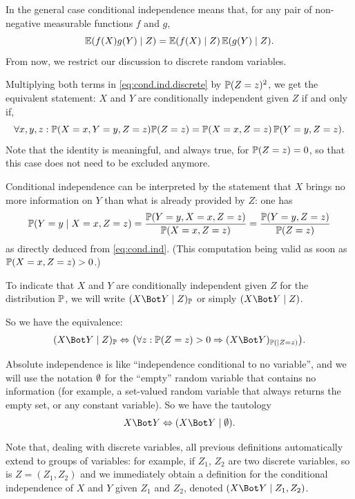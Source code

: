 In the general case conditional independence means that,  for any pair of non-negative measurable functions $f$ and $g$,
\begin{equation}
\label{eq:cond.ind.gen}
\bm{\mathbb E}(f(X)g(Y)\mid Z) = \bm{\mathbb E}(f(X)\mid Z)\,\bm{\mathbb E}(g(Y)\mid Z).
\end{equation}
From now, we restrict our discussion to discrete random variables.

Multiplying both terms in \cref{eq:cond.ind.discrete} by $\bm{\mathbb P}(Z=z)^2$, we get the equivalent statement:
$X$ and $Y$ are
conditionally independent given $Z$ if and only if, 
\begin{equation}
\label{eq:cond.ind}
\forall x,y,z: \bm{\mathbb P}(X=x, Y=y, Z=z)\bm{\mathbb P}(Z=z) = \bm{\mathbb P}(X=x, Z=z)\, \bm{\mathbb P}(Y=y, Z=z).
\end{equation}
Note that the identity is meaningful, and always true, for $\bm{\mathbb P}(Z=z)=0$, so that this case does not need to be excluded anymore.

Conditional independence  can be interpreted by the statement that $X$ brings no more information on $Y$ than what
is already provided by $Z$: one has
\[
\bm{\mathbb P}(Y=y\mid X=x, Z=z) = \frac{\bm{\mathbb P}(Y=y, X=x, Z=z)}{\bm{\mathbb P}(X=x, Z=z)} = \frac{\bm{\mathbb P}(Y=y,Z=z)}{\bm{\mathbb P}(Z=z)}
\]
as directly deduced from \cref{eq:cond.ind}. (This computation being valid as soon as $\bm{\mathbb P}(X=x, Z=z) > 0$.)




\begin{notation}
\label{not:cond.ind}
To indicate
that $X$ and $Y$ are conditionally independent given $Z$ for the
distribution $\bm{\mathbb P}$, we will write
$(X\indp Y\mid Z)_{\myP}$ or simply $(X\indp Y\mid Z)$.
\end{notation}
So we have the equivalence:
$$
(X\indp Y\mid Z)_{\myP} \Leftrightarrow \big(\forall z: \myP(Z=z) > 0 \Rightarrow (X\indp Y)_{\myP( \mid Z=z)}\big).
$$

Absolute independence is like ``independence conditional to
no variable'', and we will use the notation $\emptyset$ for the ``empty'' random
variable that contains no information (for example, a set-valued
random variable that always returns the empty set, or any constant
variable). So we have the tautology
$$
X\indp Y \Leftrightarrow \cind{X}{Y}{\emp}.
$$

Note that, dealing with discrete variables, all previous definitions
automatically extend to groups of variables: for example, if $Z_1$,
$Z_2$ are two discrete variables, so is $Z = (Z_1,Z_2)$ and we
immediately obtain a definition for the conditional independence of $X$ and $Y$ given
$Z_1$ and $Z_2$, denoted $(X\indp Y\mid Z_1,Z_2)$. 

